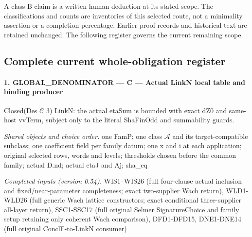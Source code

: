 A class-B claim is a written human deduction at its stated scope.
The classifications and counts are inventories of this selected route,
not a minimality assertion or a completion percentage. Earlier proof
records and historical text are retained unchanged. The following
register governs the current remaining scope.

\subsection{Complete current whole-obligation register}

\paragraph{1. GLOBAL\_\allowbreak DENOMINATOR — C — Actual LinkN local table and binding producer}

Closed(Des $\mathcal C$ 3) LinkN: the actual etaSum is bounded with exact dZ0 and same-host vvTerm, subject only to the literal ShaFinOdd and summability guards.

\emph{Shared objects and choice order.} one FamP; one class $\mathcal A$ and its target-compatible subclass; one coefficient field per family datum; one x and i at each application; original selected rows, words and levels; thresholds chosen before the common family; actual D.nd; actual etaJ and Aj; sha\_\allowbreak eq

\emph{Completed inputs (version 0.54).} WIS1–WIS26 (full four-clause actual inclusion and fixed/near-parameter completeness; exact two-supplier Wach return), WLD1-WLD26 (full generic Wach lattice constructors; exact conditional three-supplier all-layer return), SSC1-SSC17 (full original Selmer SignatureChoice and family setup retaining only coherent Wach comparison), DFD1-DFD15, DNE1-DNE14 (full original ConclF-to-LinkN consumer)


